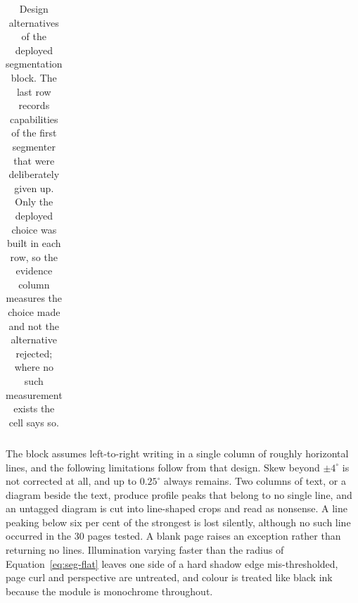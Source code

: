 \begin{table}[h]
\begin{tabularx}{\linewidth}{|p{2.1cm}|X|p{3.3cm}|}
\hline
\end{tabularx}
\caption{Design alternatives of the deployed segmentation block. The last row records capabilities of the first segmenter that were deliberately given up. Only the deployed choice was built in each row, so the evidence column measures the choice made and not the alternative rejected; where no such measurement exists the cell says so.}
\label{tab:seg-alt}
\end{table}

The block assumes left-to-right writing in a single column of roughly horizontal lines, and the following limitations follow from that design. Skew beyond $\pm4^\circ$ is not corrected at all, and up to $0.25^\circ$ always remains. Two columns of text, or a diagram beside the text, produce profile peaks that belong to no single line, and an untagged diagram is cut into line-shaped crops and read as nonsense. A line peaking below six per cent of the strongest is lost silently, although no such line occurred in the 30 pages tested. A blank page raises an exception rather than returning no lines. Illumination varying faster than the radius of Equation~\ref{eq:seg-flat} leaves one side of a hard shadow edge mis-thresholded, page curl and perspective are untreated, and colour is treated like black ink because the module is monochrome throughout.

